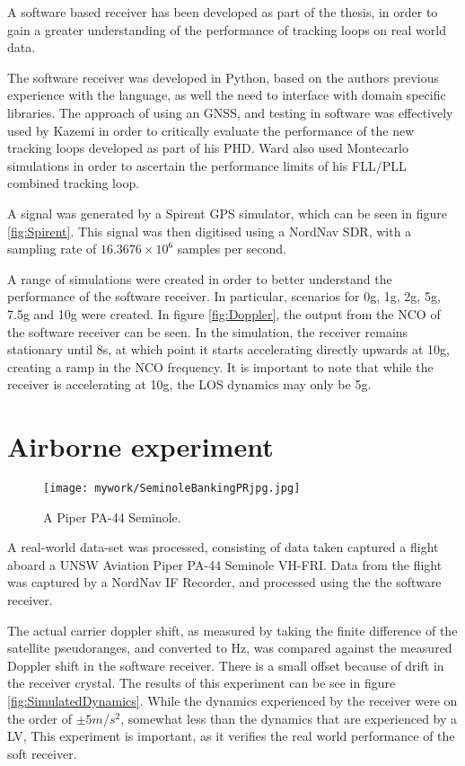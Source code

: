 A software based receiver has been developed as part of the thesis, in order to gain a greater understanding of the performance of tracking loops on real world data. 

The software receiver was developed in Python, based on the authors previous experience with the language, as well the need to interface with domain specific libraries.  The approach of using an \ac{GNSS}, and testing in software was effectively used by Kazemi \cite{KazemiPHD} in order to critically evaluate the performance of the new tracking loops developed as part of his PHD. Ward also used Montecarlo simulations in order to ascertain the performance limits of his FLL/PLL combined tracking loop.

A signal was generated by a Spirent \ac{GPS} simulator, which can be seen in figure \ref{fig:Spirent}. This signal was then digitised using a NordNav \ac{SDR}, with a sampling rate of $16.3676 \times 10^6$ samples per second. 

A range of simulations were created in order to better understand the performance of the software receiver. In particular, scenarios for 0g, 1g, 2g, 5g, 7.5g and 10g were created. In figure \ref{fig:Doppler}, the output from the \ac{NCO} of the software receiver can be seen. In the simulation, the receiver remains stationary until 8s, at which point it starts accelerating directly upwards at 10g, creating a ramp in the \ac{NCO} frequency. It is important to note that while the receiver is accelerating at 10g, the \ac{LOS} dynamics may only be 5g. 


\section{Airborne experiment}

\begin{figure}[!htb] 
    \centering
    \texttt{[image: mywork/SeminoleBankingPRjpg.jpg]} 
    \caption{A Piper PA-44 Seminole.}
    \label{fig:PiperSeminole}
\end{figure}

A real-world data-set was processed, consisting of data taken captured a flight aboard a UNSW Aviation Piper PA-44 Seminole VH-FRI. Data from the flight was captured by a NordNav IF Recorder, and processed using the the software receiver. 

The actual carrier doppler shift, as measured by taking the finite difference of the satellite pseudoranges, and converted to Hz, was compared against the measured Doppler shift in the software receiver. There is a small offset because of drift in the receiver crystal. The results of this experiment can be see in figure \ref{fig:SimulatedDynamics}. While the dynamics experienced by the receiver were on the order of $\pm 5m/s^2$, somewhat less than the dynamics that are experienced by a \ac{LV}, This experiment is important, as it verifies the real world performance of the soft receiver. 


